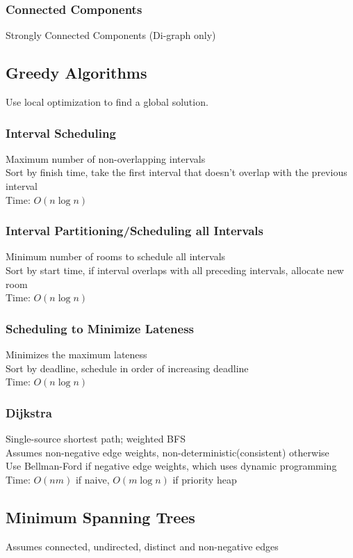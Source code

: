 \documentclass{article}
\begin{document}
\begin{multicols*}{2}
        \subsubsection*{Connected Components}
        Strongly Connected Components (Di-graph only)
        \subsection*{Greedy Algorithms}
        Use local optimization to find a global solution.
        \subsubsection*{Interval Scheduling}
        Maximum number of non-overlapping intervals\\
        Sort by finish time, take the first interval that doesn't overlap
        with the previous interval\\
        Time: $O(n\log n)$
        \subsubsection*{Interval Partitioning/Scheduling all Intervals}
        Minimum number of rooms to schedule all intervals\\
        Sort by start time, if interval overlaps with all preceding intervals, allocate new room\\
        Time: $O(n\log n)$
        \subsubsection*{Scheduling to Minimize Lateness}
        Minimizes the maximum lateness\\
        Sort by deadline, schedule in order of increasing deadline\\
        Time: $O(n\log n)$
        \subsubsection*{Dijkstra}
        Single-source shortest path; weighted BFS\\
        Assumes non-negative edge weights, non-deterministic(consistent) otherwise\\
        Use Bellman-Ford if negative edge weights, which uses dynamic programming\\
        Time: $O(nm)$ if naive, $O(m\log n)$ if priority heap
        \subsection*{Minimum Spanning Trees}
        Assumes connected, undirected, distinct and non-negative edges

\end{multicols*}
\end{document}
